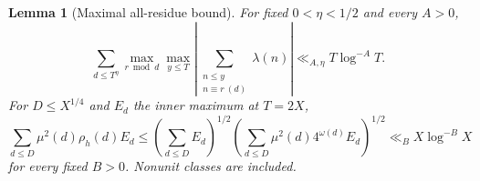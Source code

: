 \documentclass[11pt]{article}
\newtheorem{lemma}[theorem]{Lemma}
\theoremstyle{definition}
\theoremstyle{remark}
\numberwithin{equation}{section}
\begin{document}
\begin{lemma}[Maximal all-residue bound]\label{lem:all-residue}
For fixed $0<\eta<1/2$ and every $A>0$,
\begin{equation}\label{eq:bv-all}
 \sum_{d\le T^\eta}\max_{r\bmod d}\max_{y\le T}
 \left|\sum_{\substack{n\le y\\n\equiv r\ (d)}}\lambda(n)\right|
 \ll_{A,\eta}T\log^{-A}T.
\end{equation}
For $D\le X^{1/4}$ and $E_d$ the inner maximum at $T=2X$,
\begin{equation}\label{eq:bv-weighted}
 \sum_{d\le D}\mu^2(d)\rho_h(d)E_d
 \le\left(\sum_{d\le D}E_d\right)^{1/2}
 \left(\sum_{d\le D}\mu^2(d)4^{\omega(d)}E_d\right)^{1/2}
 \ll_B X\log^{-B}X
\end{equation}
for every fixed $B>0$. Nonunit classes are included.
\end{lemma}
\end{document}

